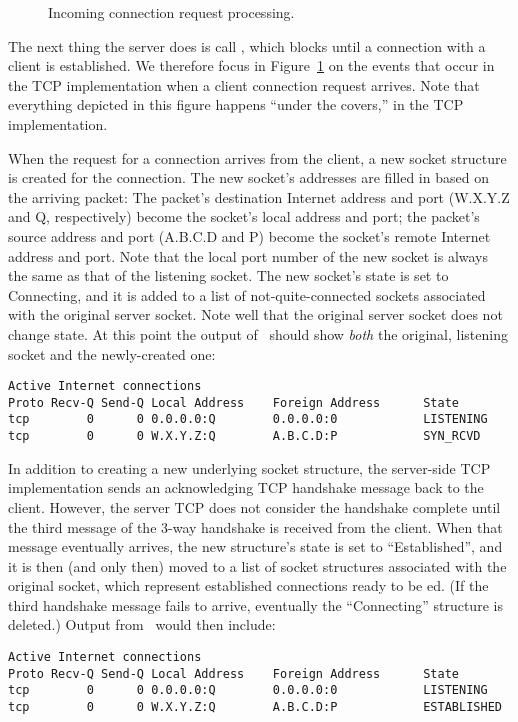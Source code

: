 \begin{figure}
\caption{\label{fsm1b}Incoming connection request processing.}
\end{figure}


The next thing the server does is call , which
blocks until a connection with a client is established.
We therefore focus in Figure~\ref{fsm1b} on the events that
occur in the TCP implementation when a client connection request
arrives.  Note that everything depicted in this figure happens
``under the covers,'' in the TCP implementation.

When the request for a connection arrives from the client,
a new socket structure is created for the connection.
The new socket's addresses are filled
in based on the arriving packet: The packet's destination  Internet
address and port (W.X.Y.Z and Q, respectively)  become the socket's local
address and port; the packet's source
address and port (A.B.C.D and P)
become the  socket's remote Internet address and port.
Note that the local port number  of the new socket
is always the same as that of the listening socket.
The new socket's state is set to Connecting, and it is added to a list of
not-quite-connected sockets associated with the original server socket.
Note well that the original server socket does not change state.
%
At this point the output of \netstat\ should show \emph{both\/} the original,
listening socket and the newly-created one:
\begin{verbatim}
Active Internet connections
Proto Recv-Q Send-Q Local Address    Foreign Address      State      
tcp        0      0 0.0.0.0:Q        0.0.0.0:0            LISTENING
tcp        0      0 W.X.Y.Z:Q        A.B.C.D:P            SYN_RCVD
\end{verbatim}

In addition to creating a new underlying socket structure, the
server-side TCP implementation sends an acknowledging TCP handshake
message back to the client.  However, the server TCP does not consider
the handshake complete until the third message of the 3-way handshake
is received from the client.  When that message eventually arrives,
the new structure's state is set to ``Established'', and it is then
(and only then) moved to a list of socket structures associated with
the original socket, which represent established connections ready to be
ed.
(If the third
handshake message fails to arrive, eventually the ``Connecting''
structure is deleted.)
Output from \netstat\ would then include:
\begin{verbatim}
Active Internet connections
Proto Recv-Q Send-Q Local Address    Foreign Address      State      
tcp        0      0 0.0.0.0:Q        0.0.0.0:0            LISTENING
tcp        0      0 W.X.Y.Z:Q        A.B.C.D:P            ESTABLISHED
\end{verbatim}


